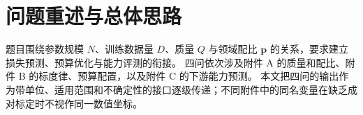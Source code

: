 \section{问题重述与总体思路}
题目围绕参数规模 $N$、训练数据量 $D$、质量 $Q$ 与领域配比 $\boldsymbol p$ 的关系，要求建立损失预测、预算优化与能力评测的衔接。
四问依次涉及附件 A 的质量和配比、附件 B 的标度律、预算配置，以及附件 C 的下游能力预测。
本文把四问的输出作为带单位、适用范围和不确定性的接口逐级传递；不同附件中的同名变量在缺乏成对标定时不视作同一数值坐标。

